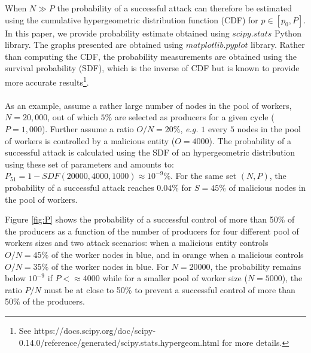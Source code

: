 When $N \gg P$ the probability of a successful attack can therefore be estimated using the cumulative hypergeometric distribution function (CDF) for $p \in [p_0,P]$. In this paper, we provide probability estimate obtained using $scipy.stats$ Python library. The graphs presented are obtained using $matplotlib.pyplot$ library. Rather than computing the CDF, the probability measurements are obtained using the survival probability (SDF), which is the inverse of CDF but is known to provide more accurate results\footnote{See https://docs.scipy.org/doc/scipy-0.14.0/reference/generated/scipy.stats.hypergeom.html for more details.}. \\
\\
As an example, assume a rather large number of nodes in the pool of workers, $N = 20,000$, out of which $5\%$ are selected as producers for a given cycle ($P = 1,000$). 
Further assume a ratio $O/N=20\%$, \textit{e.g.} $1$ every $5$ nodes in the pool of workers is controlled by a malicious entity ($O=4000$). The probability of a successful attack is calculated using the SDF of an hypergeometric distribution using these set of parameters and amounts to: $P_51 = 1-SDF(20000,4000,1000) \approx 10^{-9}\%$. For the same set $(N,P)$, the probability of a successful attack reaches $0.04\%$ for $S=45\%$ of malicious nodes in the pool of workers. 

Figure \ref{fig:P} shows the probability of a successful control of more than 50\% of the producers as a function of the number of producers for four different pool of workers sizes and two attack scenarios: when a malicious entity controls $O/N = 45\%$ of the worker nodes in blue, and in orange when a malicious controls $O/N = 35\%$ of the worker nodes in blue. For $N=20000$, the probability remains below $10^{-9}$ if $P < \approx 4000$ while for a smaller pool of worker size ($N=5000$), the ratio $P/N$ must be at close to 50\% to prevent a successful control of more than 50\% of the producers. 

